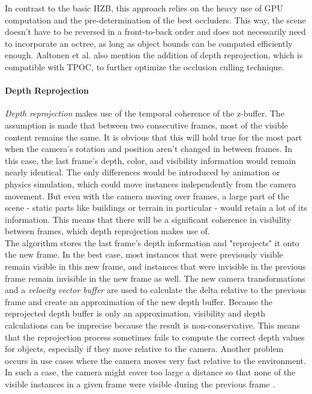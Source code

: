 \noindent
In contrast to the basic \ac{HZB}, this approach relies on the heavy use of \ac{GPU} computation and the 
pre-determination of the best occluders. This way, the scene doesn't have to be reversed in a front-to-back order 
and does not necessarily need to incorporate an octree, as long as object bounds can be computed efficiently enough.
Aaltonen et al. \cite{Aaltonen2015} also mention the addition of depth reprojection, which is compatible with 
\ac{TPOC}, to further optimize the occlusion culling technique.


\paragraph*{Depth Reprojection} \label{subsubsec-depth-reprojection}

\emph{Depth reprojection} makes use of the temporal coherence of the z-buffer. The assumption is made that 
between two consecutive frames, most of the visible content remains the same. It is obvious that this will 
hold true for the most part when the camera's rotation and position aren't changed in between frames. In 
this case, the last frame's depth, color, and visibility information would remain nearly identical. The only 
differences would be introduced by animation or physics simulation, which could move instances independently 
from the camera movement. But even with the camera moving over frames, a large part of the scene - static 
parts like buildings or terrain in particular - would retain a lot of its information. This means that there 
will be a significant coherence in visibility between frames, which depth reprojection makes use of.\\

\noindent
The algorithm stores the last frame's depth information and "reprojects" it onto the new frame. In the best case, 
most instances that were previously visible remain visible in this new frame, and instances that were invisible 
in the previous frame remain invisible in the new frame as well. The new camera transformations and a 
\emph{velocity vector buffer} are used to calculate the delta relative to the previous frame and create an 
approximation of the new depth buffer. Because the reprojected depth buffer is only an approximation, visibility 
and depth calculations can be imprecise because the result is non-conservative. This means that the reprojection 
process sometimes fails to compute the correct depth values for objects, especially if they move relative to the 
camera. Another problem occurs in use cases where the camera moves very fast relative to the environment. In such 
a case, the camera might cover too large a distance so that none of the visible instances in a given frame were 
visible during the previous frame \cite{Kruskonja2022}. \\


